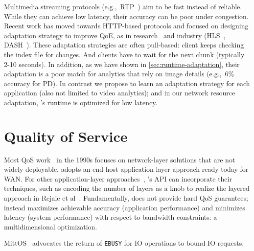 \documentclass[thesis.tex]{subfiles}
\begin{document}
 Multimedia streaming protocols
(e.g.,~RTP~\cite{schulzrinne2006rtp}) aim to be fast instead of reliable. While
they can achieve low latency, their accuracy can be poor under congestion.
Recent work has moved towards HTTP-based protocols and focused on designing
adaptation strategy to improve QoE, as in research~\cite{mao2017neural,
  sun2016cs2p, yin2015control} and industry (HLS~\cite{pantos2016http},
DASH~\cite{michalos2012dynamic, sodagar2011mpeg}). These adaptation strategies
are often pull-based: client keeps checking the index file for changes. And
clients have to wait for the next chunk (typically 2-10 seconds). In addition,
as we have shown in \autoref{sec:runtime-adaptation}, their adaptation is a poor
match for analytics that rely on image details (e.g.,~6\% accuracy for PD). In
contrast we propose to learn an adaptation strategy for each application (also
not limited to video analytics); and in our network resource adaptation,
\awstream{}'s runtime is optimized for low latency.

\section{Quality of Service}
\label{sec:quality-service}

Most QoS work~\cite{ferrari1990scheme, shenker1994integrated,
  shenker1995fundamental} in the 1990s focuses on network-layer solutions that
are not widely deployable. \sysname{} adopts an end-host application-layer
approach ready today for WAN. For other application-layer
approaches~\cite{vandalore2001survey}, \sysname{}'s API can incorporate their
techniques, such as encoding the number of layers as a knob to realize the
layered approach in Rejaie et al~\cite{rejaie2000layered}. Fundamentally,
\sysname{} does not provide hard QoS guarantees; instead \sysname{} maximizes
achievable accuracy (application performance) and minimizes latency (system
performance) with respect to bandwidth constraints: a multidimensional
optimization.

 MittOS~\cite{hao2017mittos} advocates the return of
\texttt{EBUSY} for IO operations to bound IO requests.

\end{document}
